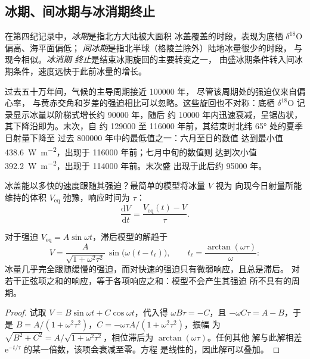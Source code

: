 \subsection*{冰期、间冰期与冰消期终止}

\begin{definition}\label{def:b2:orbital-forcing:glacials}
在第四纪记录中，\emph{冰期}是指北方大陆被大面积
冰盖覆盖的时段，表现为底栖 $\delta^{18}$O 偏高、海平面偏低；
\emph{间冰期}是指北半球（格陵兰除外）陆地冰量很少的时段，
与现今相似。\emph{冰消期
终止}是结束冰期旋回的主要转变之一，
由盛冰期条件转入间冰期条件，速度远快于此前冰量的增长。
\end{definition}

过去五十万年间，气候的主导周期接近 \num{100000} 年，
尽管该周期处的强迫仅来自偏心率，
与黄赤交角和岁差的强迫相比可以忽略。这些旋回也不对称：底栖 $\delta^{18}$O
记录显示冰量以阶梯式增长约 \num{90000} 年，随后
约 \num{10000} 年内迅速衰减，呈锯齿状，其下降沿即为。末次，自
约 \num{129000} 至 \num{116000} 年前，其结束时北纬 \ang{65} 处的夏季日射量下降至
过去 \num{800000} 年中的最低值之一：六月至日的数值
达到最小值 \qty{438.6}{W.m^{-2}}，出现于 \num{116000} 年前；七月中旬的数值则
达到次小值 \qty{392.2}{W.m^{-2}}，出现于 \num{114000} 年前。末次盛
出现于此后约 \num{95000} 年。

冰盖能以多快的速度跟随其强迫？最简单的模型将冰量 $V$ 视为
向现今日射量所能维持的体积 $V_{\mathrm{eq}}$ 弛豫，响应时间为
$\tau$：
\[
  \frac{\mathrm dV}{\mathrm dt} = \frac{V_{\mathrm{eq}}(t) - V}{\tau} .
\]

\begin{proposition}[滞后响应]\label{prop:b2:orbital-forcing:lag}
对于强迫 $V_{\mathrm{eq}} = A\sin\omega t$，滞后模型的解趋于
\[
  V = \frac{A}{\sqrt{1 + \omega^2\tau^2}}\,\sin\bigl(\omega(t - t_{\ell})\bigr),\qquad
  t_{\ell} = \frac{\arctan(\omega\tau)}{\omega} :
\]
冰量几乎完全跟随缓慢的强迫，而对快速的强迫只有微弱响应，且总是滞后。
对若干正弦项之和的响应，等于各项响应之和：模型不会产生其强迫
所不具有的周期。
\end{proposition}

\begin{proof}
试取 $V = B\sin\omega t + C\cos\omega t$，代入得 $\omega B\tau = -C$，且 $-\omega C\tau = A -
B$，于是 $B = A/(1 + \omega^2\tau^2)$，$C = -\omega\tau A/(1 + \omega^2\tau^2)$，振幅
为 $\sqrt{B^2 + C^2} = A/\sqrt{1 + \omega^2\tau^2}$，相位滞后为 $\arctan(\omega\tau)$。任何其他
解与此解相差 $\mathrm e^{-t/\tau}$ 的某一倍数，该项会衰减至零。方程
是线性的，因此解可以叠加。
\end{proof}

